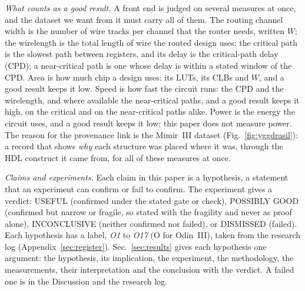 \documentclass[conference]{IEEEtran}
\begin{document}
\emph{What counts as a good result.}
A front end is judged on several measures at once, and the dataset we want from it must carry all of them.
The routing channel width is the number of wire tracks per channel that the router needs, written $W$; %
the wirelength is the total length of wire the routed design uses; %
the critical path is the slowest path between registers, and its delay is the critical-path delay (CPD); %
a near-critical path is one whose delay is within a stated window of the CPD. %
Area is how much chip a design uses: its LUTs, its CLBs and $W$, and a good result keeps it low. %
Speed is how fast the circuit runs: the CPD and the wirelength, and where available the near-critical paths, and a good result keeps it high, on the critical and on the near-critical paths alike. %
Power is the energy the circuit uses, and a good result keeps it low; this paper does not measure power. %
The reason for the provenance link is the Mimir~III dataset (Fig.~\ref{fig:yggdrasil}): a record that shows \emph{why} each structure was placed where it was, through the HDL construct it came from, for all of these measures at once.

\emph{Claims and experiments.}
Each claim in this paper is a hypothesis, a statement that an experiment can confirm or fail to confirm. %
The experiment gives a verdict: USEFUL (confirmed under the stated gate or check), POSSIBLY GOOD (confirmed but narrow or fragile, so stated with the fragility and never as proof alone), INCONCLUSIVE (neither confirmed nor failed), or DISMISSED (failed). Each hypothesis has a label, \emph{O1} to \emph{O17} (O for Odin~III), taken from the research log (Appendix~\ref{sec:register}). Sec.~\ref{sec:results} gives each hypothesis one argument: the hypothesis, its implication, the experiment, the methodology, the measurements, their interpretation and the conclusion with the verdict. A failed one is in the Discussion and the research log.
\end{document}
